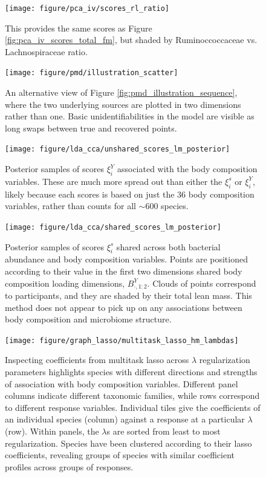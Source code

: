 \documentclass[14pt]{extarticle}
\begin{document}
\begin{figure}
  \centering
  \texttt{[image: figure/pca\_iv/scores\_rl\_ratio]}
  \caption{This provides the same scores as Figure
    \ref{fig:pca_iv_scores_total_fm}, but shaded by Ruminoccoccaceae vs.
    Lachnospiraceae ratio. \label{fig:pca_iv_scores_rl_ratio} }
\end{figure}

\begin{figure}
  \centering
  \texttt{[image: figure/pmd/illustration\_scatter]}
  \caption{An alternative view of Figure \ref{fig:pmd_illustration_sequence},
    where the two underlying sources are plotted in two dimensions rather than
    one. Basic unidentifiabilities in the model are visible as long swaps
    between true and recovered points. \label{fig:pmd_illustration_scatter} }
\end{figure}

 \begin{figure}
   \centering
   \texttt{[image: figure/lda\_cca/unshared\_scores\_lm\_posterior]}
   \caption{Posterior samples of scores $\xi^{Y}_i$ associated with the body
     composition variables. These are much more spread out than either the
     $\xi_{i}^s$ or $\xi_{i}^Y$, likely because each scores is based on just the
     36 body composition variables, rather than counts for all $\sim 600$
     species.
     \label{fig:lda_cca_unshared_scores_lm_posterior} }
 \end{figure}

 \begin{figure}
   \centering
   \texttt{[image: figure/lda\_cca/shared\_scores\_lm\_posterior]}
   \caption{Posterior samples of scores $\xi^{s}_i$ shared across both bacterial
     abundance and body composition variables. Points are positioned according
     to their value in the first two dimensions shared body composition loading
     dimensions, $B^{Y}_{\cdot, 1:2}$. Clouds of points correspond to
     participants, and they are shaded by their total lean mass. This method
     does not appear to pick up on any associations between body composition and
     microbiome structure.
 \label{fig:lda_cca_shared_scores_lm_posterior} }
 \end{figure}

\begin{figure}
  \centering
  \texttt{[image: figure/graph\_lasso/multitask\_lasso\_hm\_lambdas]}
  \caption{ Inspecting coefficients from multitask lasso across $\lambda$
    regularization parameters highlights species with different directions and
    strengths of association with body composition variables. Different panel
    columns indicate different taxonomic families, while rows correspond to
    different response variables. Individual tiles give the coefficients of an
    individual species (column) against a response at a particular $\lambda$
    (row). Within panels, the $\lambda$s are sorted from least to most
    regularization. Species have been clustered according to their lasso
    coefficients, revealing groups of species with similar coefficient profiles
    across groups of responses.
    \label{fig:graph_lasso_multitask_lasso_hm_lambdas} }
\end{figure}
\end{document}
